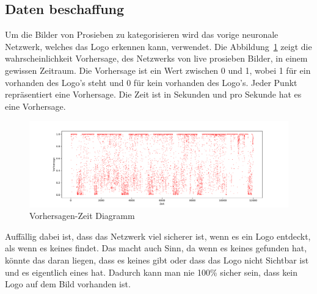 \documentclass[12pt,a4paper]{report}
\begin{document}
\subsection{Daten beschaffung}
Um die Bilder von Prosieben zu kategorisieren wird das vorige neuronale Netzwerk,
welches das Logo erkennen kann, verwendet.
Die Abbildung~\ref{fig:points} zeigt die wahrscheinlichkeit Vorhersage, des Netzwerks von live prosieben Bilder, in einem gewissen Zeitraum.
Die Vorhersage ist ein Wert zwischen 0 und 1, wobei 1 für ein vorhanden des Logo's steht und 0 für kein vorhanden des Logo's.
Jeder Punkt repräsentiert eine Vorhersage.
Die Zeit ist in Sekunden und pro Sekunde hat es eine Vorhersage.
\begin{figure}[h]%
    \centering
    \includegraphics[width=1.0\textwidth]{assets/python/points.pdf}%
    \caption{Vorhersagen-Zeit Diagramm}%
    \label{fig:points}%
\end{figure}
Auffällig dabei ist, dass das Netzwerk viel sicherer ist, wenn es ein Logo entdeckt, als wenn es keines findet.
Das macht auch Sinn, da wenn es keines gefunden hat, könnte das daran liegen,
dass es keines gibt oder dass das Logo nicht Sichtbar ist und es eigentlich eines hat.
Dadurch kann man nie 100\% sicher sein, dass kein Logo auf dem Bild vorhanden ist.
\end{document}
